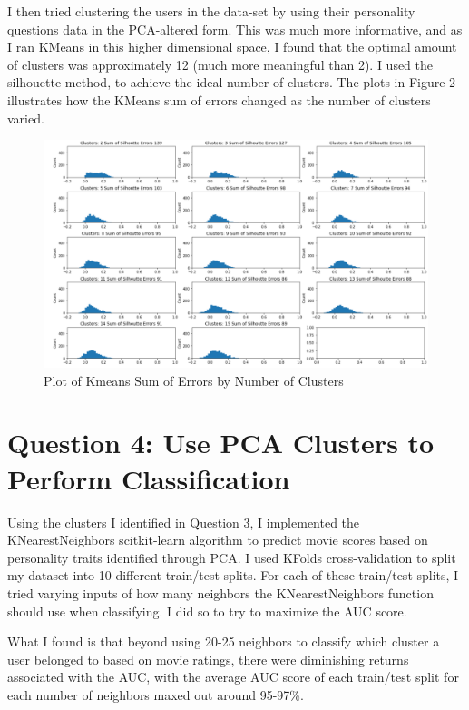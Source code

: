 \documentclass[12pt,twoside]{article}
\begin{document}
I then tried clustering the users in the data-set by using their personality questions data in the PCA-altered form. This was much more informative, and as I ran KMeans in this higher dimensional space, I found that the optimal amount of clusters was approximately 12 (much more meaningful than 2). I used the silhouette method, to achieve the ideal number of clusters. The plots in Figure 2 illustrates how the KMeans sum of errors changed as the number of clusters varied.  

\begin{figure}[h!]
    \centering
    \includegraphics[scale=.7]{kmeans plots.png}
    \caption{Plot of Kmeans Sum of Errors by Number of Clusters}
    \label{fig:my_label}
\end{figure}


\section*{Question 4: Use PCA Clusters to Perform Classification}
Using the clusters I identified in Question 3, I implemented the KNearestNeighbors scitkit-learn algorithm to predict movie scores based on personality traits identified through PCA. I used KFolds cross-validation to split my dataset into 10 different train/test splits. For each of these train/test splits, I tried varying inputs of how many neighbors the KNearestNeighbors function should use when classifying. I did so to try to maximize the AUC score. 

What I found is that beyond using 20-25 neighbors to classify which cluster a user belonged to based on movie ratings, there were diminishing returns associated with the AUC, with the average AUC score of each train/test split for each number of neighbors maxed out around 95-97\%. 
\end{document}

